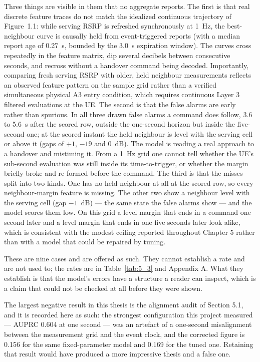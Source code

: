 Three things are visible in them that no aggregate reports. The first is that real discrete feature traces do not match the idealized continuous trajectory of Figure~1.1: while serving RSRP is refreshed synchronously at 1~Hz, the best-neighbour curve is causally held from event-triggered reports (with a median report age of 0.27~s, bounded by the 3.0~s expiration window). The curves cross repeatedly in the feature matrix, dip several decibels between consecutive seconds, and recross without a handover command being decoded. Importantly, comparing fresh serving RSRP with older, held neighbour measurements reflects an observed feature pattern on the sample grid rather than a verified simultaneous physical A3 entry condition, which requires continuous Layer 3 filtered evaluations at the UE. The second is that the false alarms are early rather than spurious. In all three drawn false alarms a command does follow, 3.6 to 5.6~s after the scored row, outside the one-second horizon but inside the five-second one; at the scored instant the held neighbour is level with the serving cell or above it (gaps of $+1$, $-19$ and $0$~dB). The model is reading a real approach to a handover and mistiming it. From a 1~Hz grid one cannot tell whether the UE's sub-second evaluation was still inside its time-to-trigger, or whether the margin briefly broke and re-formed before the command. The third is that the misses split into two kinds. One has no held neighbour at all at the scored row, so every neighbour-margin feature is missing. The other two show a neighbour level with the serving cell (gap $-1$~dB) --- the same state the false alarms show --- and the model scores them low. On this grid a level margin that ends in a command one second later and a level margin that ends in one five seconds later look alike, which is consistent with the modest ceiling reported throughout Chapter 5 rather than with a model that could be repaired by tuning.

These are nine cases and are offered as such. They cannot establish a rate and are not used to; the rates are in Table~\ref{tab:5_3} and Appendix A. What they establish is that the model's errors have a structure a reader can inspect, which is a claim that could not be checked at all before they were shown.

The largest negative result in this thesis is the alignment audit of Section 5.1, and it is recorded here as such: the strongest configuration this project measured --- AUPRC 0.604 at one second --- was an artefact of a one-second misalignment between the measurement grid and the event clock, and the corrected figure is 0.156 for the same fixed-parameter model and 0.169 for the tuned one. Retaining that result would have produced a more impressive thesis and a false one.

